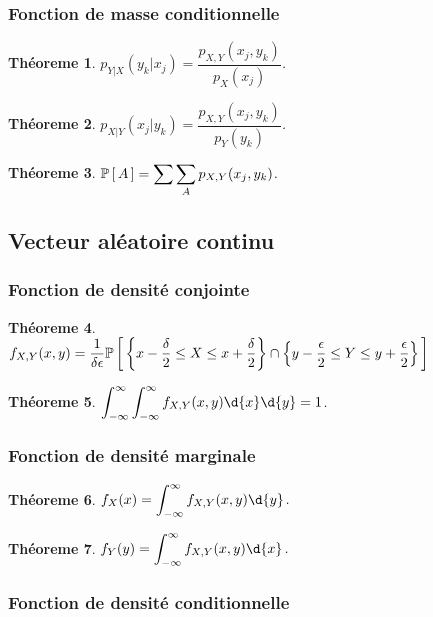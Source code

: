 \documentclass[11pt]{article}
\renewcommand\P[1]{%
	\ensuremath{%
		\mathbb{P}\left[\,#1\,\right]%
	}%
}%
\newtheorem{theoreme}{Théoreme}[section]
\begin{document}
\subsubsection{Fonction de masse conditionnelle}
\begin{theoreme}
	$p_{Y|X}(y_k|x_j)=\dfrac{p_{X,Y}(x_j,y_k)}{p_X(x_j)}$.
\end{theoreme}

\begin{theoreme}
	$p_{X|Y}(x_j|y_k)=\dfrac{p_{X,Y}(x_j,y_k)}{p_Y(y_k)}$.
\end{theoreme}

\begin{theoreme}
	$\P{A}=\displaystyle\sum\displaystyle\sum_Ap_{X,Y}(x_j,y_k)$.
\end{theoreme}

\subsection{Vecteur aléatoire continu}
\subsubsection{Fonction de densité conjointe}
\begin{theoreme}
	$f_{X,Y}(x,y)=\dfrac{1}{\delta\epsilon}\P{
		\left\{
			x-\dfrac{\delta}{2}\leq X\leq x+\dfrac{\delta}{2}
		\right\}\cap
		\left\{
			y-\dfrac{\epsilon}{2}\leq Y\leq y+\dfrac{\epsilon}{2}
		\right\}
	}$
\end{theoreme}

\begin{theoreme}
	$\displaystyle\int_{-\infty}^\infty\displaystyle\int_{-\infty}^\infty
		f_{X,Y}(x,y)\d{x}\d{y}=1$.
\end{theoreme}

\subsubsection{Fonction de densité marginale}
\begin{theoreme}
	$f_X(x)=\displaystyle\int_{-\infty}^\infty f_{X,Y}(x,y)\d{y}$.
\end{theoreme}

\begin{theoreme}
	$f_Y(y)=\displaystyle\int_{-\infty}^\infty f_{X,Y}(x,y)\d{x}$.
\end{theoreme}

\subsubsection{Fonction de densité conditionnelle}
\end{document}
